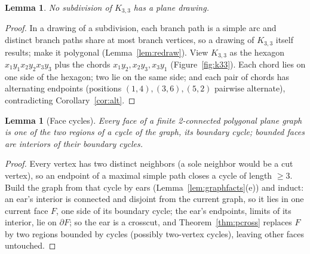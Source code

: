 \documentclass[11pt,a4paper]{article}
\theoremstyle{jsplain}
\newtheorem{lemma}[theorem]{Lemma}
\theoremstyle{jsdefn}
\begin{document}
\begin{lemma}\label{lem:k33}
No subdivision of $K_{3,3}$ has a plane drawing.
\end{lemma}
\begin{proof}
In a drawing of a subdivision, each branch path is a simple arc and
distinct branch paths share at most branch vertices, so a drawing of
$K_{3,3}$ itself results; make it polygonal
(Lemma~\ref{lem:redraw}). View $K_{3,3}$ as the hexagon
$x_1y_1x_2y_2x_3y_3$ plus the chords $x_1y_2,x_2y_3,x_3y_1$
(Figure~\ref{fig:k33}). Each
chord lies on one side of the hexagon; two lie on the same side; and
each pair of chords has alternating endpoints (positions
$(1,4),(3,6),(5,2)$ pairwise alternate), contradicting
Corollary~\ref{cor:alt}.
\end{proof}

\begin{lemma}[Face cycles]\label{lem:facecycles}
Every face of a finite 2-connected polygonal plane graph is one of the
two regions of a cycle of the graph, its boundary cycle; bounded faces
are interiors of their boundary cycles.
\end{lemma}
\begin{proof}
Every vertex has two distinct neighbors (a sole neighbor would be a
cut vertex), so an endpoint of a maximal simple path closes a cycle of
length $\ge3$. Build the graph from that cycle by ears
(Lemma~\ref{lem:graphfacts}(e)) and induct: an ear's interior is
connected and disjoint from the current graph, so it lies in one
current face $F$, one side of its boundary cycle; the ear's endpoints,
limits of its interior, lie on $\partial F$; so the ear is a crosscut,
and Theorem~\ref{thm:pcross} replaces $F$ by two regions bounded by
cycles (possibly two-vertex cycles), leaving other faces untouched.
\end{proof}
\end{document}
